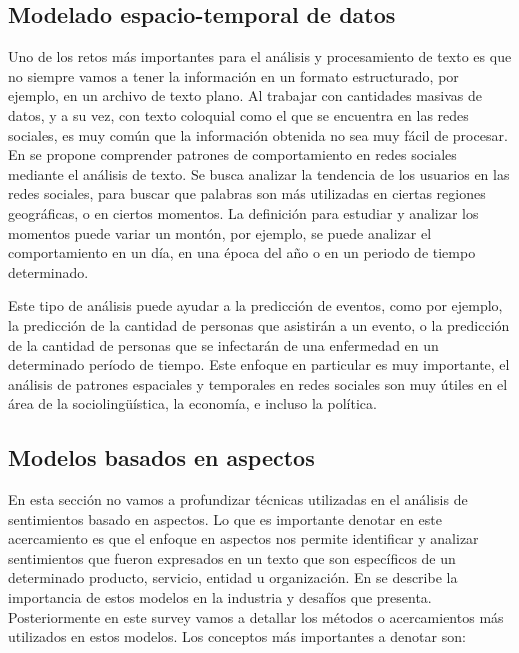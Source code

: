 \documentclass[12pt, conference]{IEEEtran}
\begin{document}
\subsection{Modelado espacio-temporal de datos}\label{subsec:Modelado}

Uno de los retos más importantes para el análisis y procesamiento de texto es que no siempre vamos a tener la información en un formato estructurado, por ejemplo, en un archivo de texto plano.
Al trabajar con cantidades masivas de datos, y a su vez, con texto coloquial como el que se encuentra en las redes sociales, es muy común que la información obtenida no sea muy fácil de procesar. 
En \cite{b19} se propone comprender patrones de comportamiento en redes sociales mediante el análisis de texto. Se busca analizar la tendencia de los usuarios en las redes sociales, para buscar que palabras son más utilizadas en ciertas regiones geográficas, o en ciertos momentos.
La definición para estudiar y analizar los momentos puede variar un montón, por ejemplo, se puede analizar el comportamiento en un día, en una época del año o en un periodo de tiempo determinado.

Este tipo de análisis puede ayudar a la predicción de eventos, como por ejemplo, la predicción de la cantidad de personas que asistirán a un evento, o la predicción de la cantidad de personas que se infectarán de una enfermedad en un determinado período de tiempo.
Este enfoque en particular es muy importante, el análisis de patrones espaciales y temporales en redes sociales son muy útiles en el área de la sociolingüística, la economía, e incluso la política.

\subsection{Modelos basados en aspectos}

En esta sección no vamos a profundizar técnicas utilizadas en el análisis de sentimientos basado en aspectos. Lo que es importante denotar en este acercamiento es que el enfoque en aspectos nos permite identificar y analizar sentimientos que fueron expresados en un texto que son específicos de un determinado producto, servicio, entidad u organización.
En \cite{b21} se describe la importancia de estos modelos en la industria y desafíos que presenta. Posteriormente en este survey vamos a detallar los métodos o acercamientos más utilizados en estos modelos. Los conceptos más importantes a denotar son:
\end{document}
